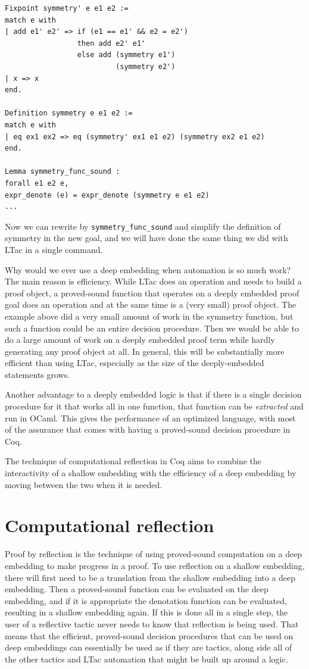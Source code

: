 \documentclass{puthesis}
\begin{document}
\begin{lstlisting}
Fixpoint symmetry' e e1 e2 := 
match e with
| add e1' e2' => if (e1 == e1' && e2 = e2') 
                 then add e2' e1' 
                 else add (symmetry e1') 
                          (symmetry e2')
| x => x
end.

Definition symmetry e e1 e2 :=
match e with
| eq ex1 ex2 => eq (symmetry' ex1 e1 e2) (symmetry ex2 e1 e2)
end.

Lemma symmetry_func_sound : 
forall e1 e2 e,
expr_denote (e) = expr_denote (symmetry e e1 e2)
...
\end{lstlisting}

Now we can rewrite by \lstinline|symmetry_func_sound| and simplify the definition
of symmetry in the new goal, and we will have done the same thing we
did with LTac in a single command.

Why would we ever use a deep embedding when automation is so much
work? The main reason is efficiency. While LTac does an operation and
needs to build a proof object, a proved-sound function that operates on
a deeply embedded proof goal does an operation and at the same time is
a (very small) proof object. The example above did a very small amount
of work in the symmetry function, but such a function could be an
entire decision procedure. Then we would be able to do a large
amount of work on a deeply embedded proof term while hardly generating
any proof object at all. In general, this will be substantially more
efficient than using LTac, especially as the size of the
deeply-embedded statements grows. 

Another advantage to a deeply embedded logic is that if there is a
single decision procedure for it that works all in one function, that
function can be \emph{extracted} and run in OCaml. This gives the
performance of an optimized language, with most of the assurance that
comes with having a proved-sound decision procedure in Coq.

The technique of computational reflection in Coq aims to combine the
interactivity of a shallow embedding with the efficiency of a deep
embedding by moving between the two when it is needed.

\section{Computational reflection}

Proof by reflection is the technique of using proved-sound computation
on a deep embedding to make progress in a proof. To use reflection on
a shallow embedding, there will first need to be a translation from
the shallow embedding into a deep embedding. Then a proved-sound
function can be evaluated on the deep embedding, and if it is
appropriate the denotation function can be evaluated, resulting in a
shallow embedding again.  If this is done all in a single step, the
user of a reflective tactic never needs to know that reflection is
being used. That means that the efficient, proved-sound decision
procedures that can be used on deep embeddings can essentially be used
as if they are tactics, along side all of the other tactics and LTac
automation that might be built up around a logic.
\end{document}
